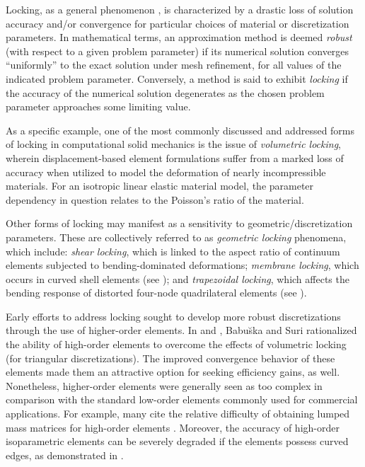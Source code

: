 		Locking, as a general phenomenon \cite{Babuska&Suri:92:1}, is characterized by a drastic loss of solution accuracy and/or convergence for particular choices of material or discretization parameters. In mathematical terms, an approximation method is deemed \textit{robust} (with respect to a given problem parameter) if its numerical solution converges ``uniformly'' to the exact solution under mesh refinement, for all values of the indicated problem parameter. Conversely, a method is said to exhibit \textit{locking} if the accuracy of the numerical solution degenerates as the chosen problem parameter approaches some limiting value.
		
		As a specific example, one of the most commonly discussed and addressed forms of locking in computational solid mechanics is the issue of \textit{volumetric locking}, wherein displacement-based element formulations suffer from a marked loss of accuracy when utilized to model the deformation of nearly incompressible materials. For an isotropic linear elastic material model, the parameter dependency in question relates to the Poisson's ratio of the material.
		
		Other forms of locking may manifest as a sensitivity to geometric/discretization parameters. These are collectively referred to as \textit{geometric locking} phenomena, which include: \textit{shear locking}, which is linked to the aspect ratio of continuum elements subjected to bending-dominated deformations; \textit{membrane locking}, which occurs in curved shell elements (see \cite{Winkler:10}); and \textit{trapezoidal locking}, which affects the bending response of distorted four-node quadrilateral elements (see \cite{MacNeal:87}).
	
		
		Early efforts to address locking sought to develop more robust discretizations through the use of higher-order elements. In \cite{Babuska&Suri:92:2} and \cite{Suri:91}, Babu\u{s}ka and Suri rationalized the ability of high-order elements to overcome the effects of volumetric locking (for triangular discretizations). The improved convergence behavior of these elements made them an attractive option for seeking efficiency gains, as well. Nonetheless, higher-order elements were generally seen as too complex in comparison with the standard low-order elements commonly used for commercial applications. For example, many cite the relative difficulty of obtaining lumped mass matrices for high-order elements \cite{Hughes:00}. Moreover, the accuracy of high-order isoparametric elements can be severely degraded if the elements possess curved edges, as demonstrated in \cite{Lee&Bathe:93}.
			
